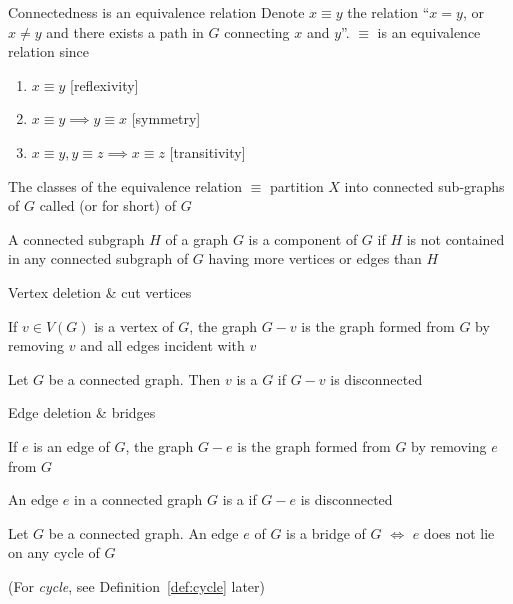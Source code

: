 \documentclass[aspectratio=43]{beamer}
\begin{document}
\begin{frame}{Connectedness is an equivalence relation}
	Denote $x\equiv y$ the relation  ``$x=y$, or $x\neq y$ and there exists a path in $G$ connecting $x$ and $y$''. $\equiv$ is an equivalence relation since
	\begin{enumerate}
		\item $x\equiv y$ \hfill[reflexivity]
		\item $x\equiv y\implies y\equiv x$ \hfill[symmetry]
		\item $x\equiv y, y\equiv z\implies x\equiv z$ \hfill[transitivity]
	\end{enumerate}
	\vfill
	\begin{definition}
		The classes of the equivalence relation $\equiv$ partition $X$ into connected sub-graphs of $G$ called  (or  for short) of $G$
	\end{definition}
	\vfill
	A connected subgraph $H$ of a graph $G$ is a component of $G$ if $H$ is not contained in any connected subgraph of $G$ having more vertices or edges than $H$
\end{frame}



\begin{frame}{Vertex deletion \& cut vertices}
\begin{definition}
If $v\in V(G)$ is a vertex of $G$, the graph $G-v$ is the graph formed from $G$ by removing $v$ and all edges incident with $v$
\end{definition}
\vfill
\begin{definition}
	Let $G$ be a connected graph. Then $v$ is a  $G$ if $G-v$ is disconnected
\end{definition}
\end{frame}


\begin{frame}{Edge deletion \& bridges}
\begin{definition}
	If $e$ is an edge of $G$, the graph $G-e$ is the graph formed from $G$ by removing $e$ from $G$
\end{definition}
\vfill
\begin{definition}[{Bridge}]
An edge $e$ in a connected graph $G$ is a  if $G-e$ is disconnected
\end{definition}
\vfill
\begin{theorem}
Let $G$ be a connected graph. An edge $e$ of $G$ is a bridge of $G$ $\iff$ $e$ does not lie on any cycle of $G$
\end{theorem}
(For \emph{cycle}, see Definition~\ref{def:cycle} later)
\end{frame}
\end{document}
